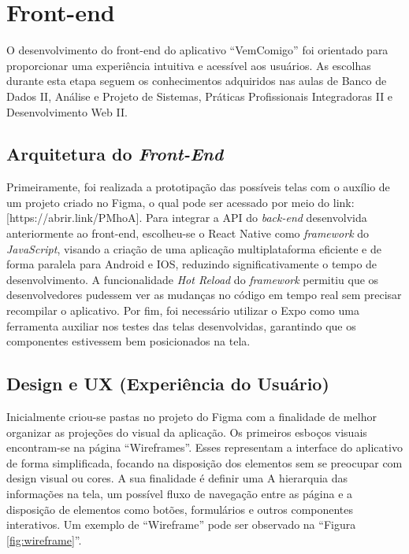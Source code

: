 \section{Front-end}

O desenvolvimento do front-end do aplicativo ``VemComigo'' foi orientado para proporcionar uma experiência intuitiva e acessível aos usuários. As escolhas durante esta etapa seguem os conhecimentos adquiridos nas aulas de Banco de Dados II, Análise e Projeto de Sistemas, Práticas Profissionais Integradoras II e Desenvolvimento Web II.

\subsection{Arquitetura do \textit{Front-End}}

Primeiramente, foi realizada a prototipação das possíveis telas com o auxílio de um projeto criado no Figma, o qual pode ser acessado por meio do link:[https://abrir.link/PMhoA]. Para integrar a API do \textit{back-end }desenvolvida anteriormente ao front-end, escolheu-se o React Native como \textit{framework} do \textit{JavaScript}, visando a criação de uma aplicação multiplataforma eficiente e de forma paralela para Android e IOS, reduzindo significativamente o tempo de desenvolvimento. A funcionalidade \textit{Hot Reload} do \textit{framework} permitiu que os desenvolvedores pudessem ver as mudanças no código em tempo real sem precisar recompilar o aplicativo. Por fim, foi necessário utilizar o Expo como uma ferramenta auxiliar nos testes das telas desenvolvidas, garantindo que os componentes estivessem bem posicionados na tela.

\subsection{Design e UX (Experiência do Usuário)}

 Inicialmente criou-se pastas no projeto do Figma com a finalidade de melhor organizar as projeções do visual da aplicação. Os primeiros esboços visuais encontram-se na página ``Wireframes''. Esses representam a interface do aplicativo de forma simplificada, focando na disposição dos elementos sem se preocupar com design visual ou cores. A sua finalidade é definir uma A hierarquia das informações na tela, um possível fluxo de navegação entre as página e a disposição de elementos como botões, formulários e outros componentes interativos. Um exemplo de ``Wireframe'' pode ser observado na ``Figura \ref{fig:wireframe}''.

